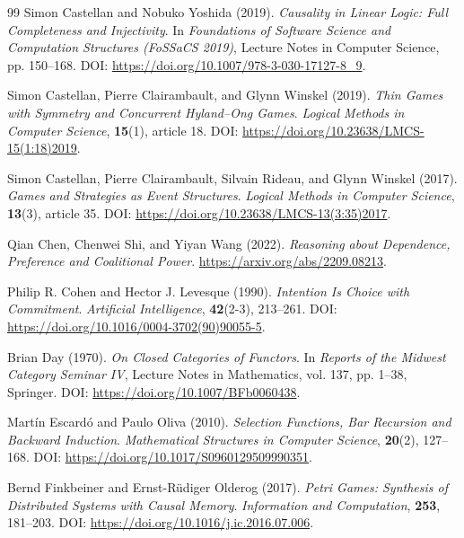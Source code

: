 \documentclass[11pt,a4paper]{article}
\numberwithin{equation}{section}
\theoremstyle{definition}
\theoremstyle{remark}
\theoremstyle{plain}
\begin{document}
\begin{thebibliography}{99}
Simon Castellan and Nobuko Yoshida (2019).
\newblock \emph{Causality in Linear Logic: Full Completeness and Injectivity}.
\newblock In \emph{Foundations of Software Science and Computation Structures (FoSSaCS 2019)}, Lecture Notes in Computer Science, pp. 150--168.
\newblock DOI: \url{https://doi.org/10.1007/978-3-030-17127-8_9}.

Simon Castellan, Pierre Clairambault, and Glynn Winskel (2019).
\newblock \emph{Thin Games with Symmetry and Concurrent Hyland--Ong Games}.
\newblock \emph{Logical Methods in Computer Science}, \textbf{15}(1), article 18.
\newblock DOI: \url{https://doi.org/10.23638/LMCS-15(1:18)2019}.

Simon Castellan, Pierre Clairambault, Silvain Rideau, and Glynn Winskel (2017).
\newblock \emph{Games and Strategies as Event Structures}.
\newblock \emph{Logical Methods in Computer Science}, \textbf{13}(3), article 35.
\newblock DOI: \url{https://doi.org/10.23638/LMCS-13(3:35)2017}.

Qian Chen, Chenwei Shi, and Yiyan Wang (2022).
\newblock \emph{Reasoning about Dependence, Preference and Coalitional Power}.
\newblock \url{https://arxiv.org/abs/2209.08213}.

Philip R. Cohen and Hector J. Levesque (1990).
\newblock \emph{Intention Is Choice with Commitment}.
\newblock \emph{Artificial Intelligence}, \textbf{42}(2-3), 213--261.
\newblock DOI: \url{https://doi.org/10.1016/0004-3702(90)90055-5}.

Brian Day (1970).
\newblock \emph{On Closed Categories of Functors}.
\newblock In \emph{Reports of the Midwest Category Seminar IV}, Lecture Notes in Mathematics, vol. 137, pp. 1--38, Springer.
\newblock DOI: \url{https://doi.org/10.1007/BFb0060438}.

Martín Escardó and Paulo Oliva (2010).
\newblock \emph{Selection Functions, Bar Recursion and Backward Induction}.
\newblock \emph{Mathematical Structures in Computer Science}, \textbf{20}(2), 127--168.
\newblock DOI: \url{https://doi.org/10.1017/S0960129509990351}.

Bernd Finkbeiner and Ernst-Rüdiger Olderog (2017).
\newblock \emph{Petri Games: Synthesis of Distributed Systems with Causal Memory}.
\newblock \emph{Information and Computation}, \textbf{253}, 181--203.
\newblock DOI: \url{https://doi.org/10.1016/j.ic.2016.07.006}.


\end{thebibliography}
\end{document}
